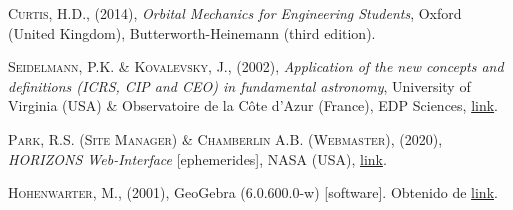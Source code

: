 \documentclass[11pt]{book}
\begin{document}
\begin{thebibliography}{99}
 \textsc{Curtis, H.D.}, (2014), \textit{Orbital Mechanics for Engineering Students}, Oxford (United Kingdom), Butterworth-Heinemann (third edition).

 \textsc{Seidelmann, P.K. \& Kovalevsky, J.}, (2002), \textit{Application of the new concepts and definitions (ICRS, CIP and CEO) in fundamental astronomy}, University of Virginia (USA) \& Observatoire de la Côte d'Azur (France), EDP Sciences, \href{https://www.aanda.org/articles/aa/full/2002/34/aa2452/aa2452.html}{link}.

 \textsc{Park, R.S. (Site Manager) \& Chamberlin A.B. (Webmaster)}, (2020), \textit{HORIZONS Web-Interface} [ephemerides], NASA (USA), \href{https://ssd.jpl.nasa.gov/horizons.cgi}{link}.

 \textsc{Hohenwarter, M.}, (2001), GeoGebra (6.0.600.0-w) [software]. Obtenido de \href{https://www.geogebra.org/classic}{link}.

\end{thebibliography}
\end{document}

